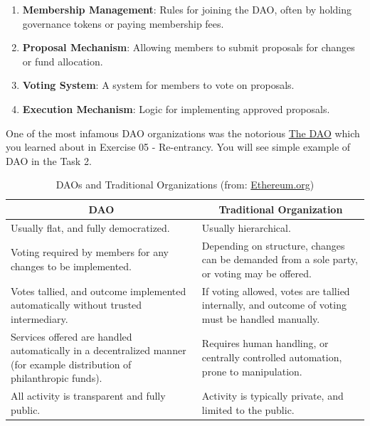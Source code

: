 \documentclass[12pt]{article}
\begin{document}
\begin{enumerate}
    \item \textbf{Membership Management}: Rules for joining the DAO, often by holding governance tokens or paying membership fees.
    \item \textbf{Proposal Mechanism}: Allowing members to submit proposals for changes or fund allocation.
    \item \textbf{Voting System}: A system for members to vote on proposals.
    \item \textbf{Execution Mechanism}: Logic for implementing approved proposals.
\end{enumerate}

\noindent
One of the most infamous DAO organizations was the notorious \href{https://en.wikipedia.org/wiki/The_DAO}{The DAO} which you learned about in Exercise 05 - Re-entrancy. You will see simple example of DAO in the Task 2.

\begin{table}[H]
    \centering
    \footnotesize
    \begin{tabular}{|p{}|p{}|}
        \hline
        \multicolumn{1}{|c|}{\textbf{DAO}}                                                                                      & \multicolumn{1}{c|}{\textbf{Traditional Organization}}                                           \\
        \hline
        Usually flat, and fully democratized.                                                                                   & Usually hierarchical.                                                                            \\
        \hline
        Voting required by members for any changes to be implemented.                                                           & Depending on structure, changes can be demanded from a sole party, or voting may be offered.     \\
        \hline
        Votes tallied, and outcome implemented automatically without trusted intermediary.                                      & If voting allowed, votes are tallied internally, and outcome of voting must be handled manually. \\
        \hline
        Services offered are handled automatically in a decentralized manner (for example distribution of philanthropic funds). & Requires human handling, or centrally controlled automation, prone to manipulation.              \\
        \hline
        All activity is transparent and fully public.                                                                           & Activity is typically private, and limited to the public.                                        \\
        \hline
    \end{tabular}
    \caption{DAOs and Traditional Organizations (from: \href{https://ethereum.org/dao/}{Ethereum.org})}
    \label{tab:dao-comparison}
\end{table}
\end{document}
